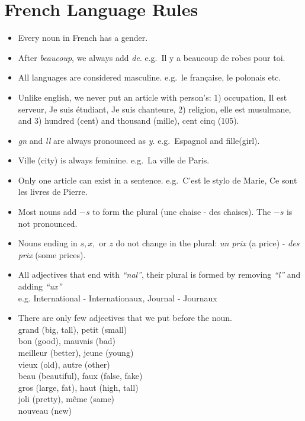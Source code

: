 \section{French Language Rules}

\begin{itemize}

\item{Every noun in French has a gender.}

\item{After \emph{beaucoup}, we always add \emph{de}. e.g.\ Il y a beaucoup de
robes pour toi.}

\item{All languages are considered masculine. e.g.\ le fran\c{c}aise, le polonais
etc.}

\item{Unlike english, we never put an article with person's:
1) occupation, Il est serveur, Je suis \'etudiant, Je suis chanteure,
2) religion, elle est musulmane, and
3) hundred (cent) and thousand (mille), cent cinq (105).}

\item{\emph{gn} and \emph{ll} are always pronounced as \emph{y}. e.g.\ Espagnol and fille(girl).}

\item{Ville (city) is always feminine. e.g.\ La ville de Paris.}

\item{Only one article can exist in a sentence. e.g.\ C'est le stylo de Marie, Ce sont les livres de Pierre.}

\item{Most nouns add $-s$ to form the plural (une chaise - des chaises).
The $-s$ is not pronounced.}

\item{Nouns ending in $s, x,$ or $z$ do not change in the plural:
\emph{un prix} (a price) - \emph{des prix} (some prices).}

\item{All adjectives that end with \emph{``nal''}, their plural is formed by removing
\emph{``l''} and adding \emph{``ux''}\\
e.g. International - Internationaux, Journal - Journaux}

\item{There are only few adjectives that we put before the noun.\\
grand (big, tall), petit (small)	 \\
bon (good), mauvais (bad) \\
meilleur (better), jeune (young)\\
vieux (old), autre (other) \\
beau (beautiful), faux (false, fake) \\
gros (large, fat), haut (high, tall) \\
joli (pretty), même (same) \\
nouveau (new)}


\end{itemize}
